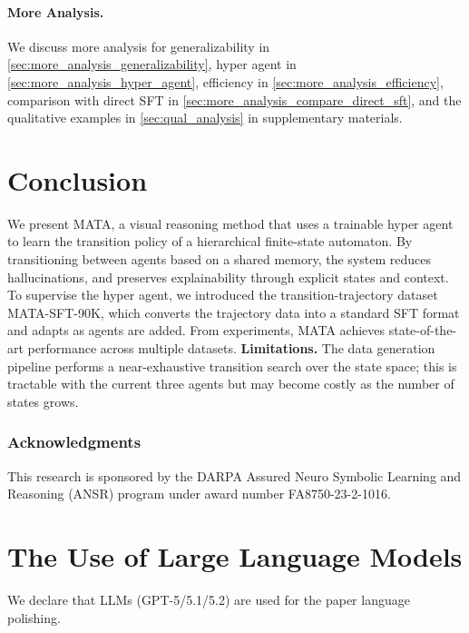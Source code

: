\documentclass{article} %
\newcommand{\revise}[1]{{#1}}
\newcommand{\methodname}{MATA}
\newcommand{\datasetname}{\methodname-SFT-90K}
\begin{document}
\revise{\paragraph{More Analysis.} We discuss more analysis for generalizability in \autoref{sec:more_analysis_generalizability}, hyper agent in \autoref{sec:more_analysis_hyper_agent}, efficiency in \autoref{sec:more_analysis_efficiency}, comparison with direct SFT in \autoref{sec:more_analysis_compare_direct_sft}, and the qualitative examples in \autoref{sec:qual_analysis} in supplementary materials.}


\section{Conclusion}

We present \methodname{}, a visual reasoning method that uses a trainable hyper agent to learn the transition policy of a hierarchical finite-state automaton. By transitioning between agents based on a shared memory, the system reduces hallucinations, and preserves explainability through explicit states and context. To supervise the hyper agent, we introduced the transition-trajectory dataset \datasetname{}, which converts the trajectory data into a standard SFT format and adapts as agents are added. From experiments, \methodname{} achieves state-of-the-art performance across multiple datasets. \textbf{Limitations.} The data generation pipeline performs a near-exhaustive transition search over the state space; this is tractable with the current three agents but may become costly as the number of states grows.


\subsubsection*{Acknowledgments}
This research is sponsored by the DARPA Assured Neuro Symbolic Learning and Reasoning (ANSR) program under award number FA8750-23-2-1016.




% 

\clearpage

\appendix

\section{The Use of Large Language Models}
We declare that LLMs (GPT-5/5.1/5.2) are used for the paper language polishing.
\end{document}

